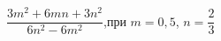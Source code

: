 \begin{ex}[type=simplify_calculate]
	\begin{condition}
		\( \dfrac{3m^2+6mn+3n^2}{6n^2-6m^2} \),\quad при \( m=0,5 \), \( n=\dfrac{2}{3} \)
	\end{condition}
\end{ex}